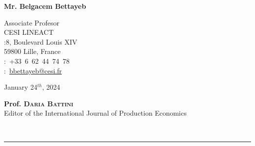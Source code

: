 \documentclass[a4,12pt]{article}
\begin{document}
	\sffamily
	\hfill
	
	\hfill    \begin{minipage}[t]{.5\textwidth}
		\raggedleft
		{\bfseries Mr. Belgacem Bettayeb}%
		
		\raggedleft
		\small
		Associate Profesor\\ 
  CESI LINEACT\\
		\Letter :8, Boulevard Louis XIV \\
                    59800 Lille, France\\ 
		\Telefon :~+33~6~62~44~74~78\\
		\Email :~\href{nbouaziz@cesi.fr}{bbettayeb@cesi.fr}
	\end{minipage}\normalsize
	
	\bigskip
	
	\begin{minipage}[t]{0.365\textwidth}
		\begin{flushleft}
			January 24$^{th}$, 2024 
		\end{flushleft} 
	\end{minipage}
	\bigskip
	
	\begin{minipage}[t]{.85\textwidth}
		\raggedright
		\small
        \textbf{Prof. \textsc{Daria Battini}} \\
		Editor of the International Journal of Production Economics\\
	\end{minipage}\\
	
	\hspace{-2.6cm}	\rule{1cm}{0.1mm}\\ \vspace{-1\baselineskip}
	
\end{document}
